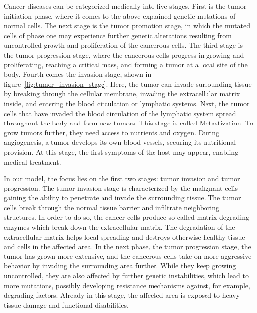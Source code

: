 Cancer diseases can be categorized medically into five stages. First is the tumor initiation phase, where it comes to the above explained genetic mutations of normal cells. The next stage is the tumor promotion stage, in which the mutated cells of phase one may experience further genetic alterations resulting from uncontrolled growth and proliferation of the cancerous cells. The third stage is the tumor progression stage, where the cancerous cells progress in growing and proliferating, reaching a critical mass, and forming a tumor at a local site of the body. Fourth comes the invasion stage, shown in figure~\ref{fig:tumor_invasion_stage}. Here, the tumor can invade surrounding tissue by breaking through the cellular membrane, invading the extracellular matrix inside, and entering the blood circulation or lymphatic systems. Next, the tumor cells that have invaded the blood circulation of the lymphatic system spread throughout the body and form new tumors. This stage is called Metastization. To grow tumors further, they need access to nutrients and oxygen. During angiogenesis, a tumor develops its own blood vessels, securing its nutritional provision. At this stage, the first symptoms of the host may appear, enabling medical treatment.

In our model, the focus lies on the first two stages: tumor invasion and tumor progression. The tumor invasion stage is characterized by the malignant cells gaining the ability to penetrate and invade the surrounding tissue. The tumor cells break through the normal tissue barrier and infiltrate neighboring structures. In order to do so, the cancer cells produce so-called matrix-degrading enzymes which break down the extracellular matrix. The degradation of the extracellular matrix helps local spreading and destroys otherwise healthy tissue and cells in the affected area. In the next phase, the tumor progression stage, the tumor has grown more extensive, and the cancerous cells take on more aggressive behavior by invading the surrounding area further. While they keep growing uncontrolled, they are also affected by further genetic instabilities, which lead to more mutations, possibly developing resistance mechanisms against, for example, degrading factors. Already in this stage, the affected area is exposed to heavy tissue damage and functional disabilities.

